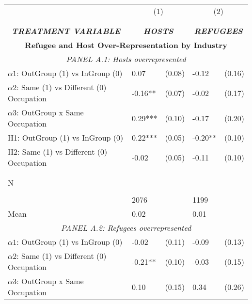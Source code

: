 \begin{tabular}{l*{4}{l}} \toprule 
                &\multicolumn{2}{c}{(1)}&\multicolumn{2}{c}{(2)}\\
                &\multicolumn{2}{c}{ } &\multicolumn{2}{c}{ } \\
\\[-0.6cm] \multicolumn{1}{c}{\textit{\textbf{TREATMENT VARIABLE}}} & \multicolumn{2}{c}{\textit{\textbf{HOSTS}}} & \multicolumn{2}{c}{\textit{\textbf{REFUGEES}}} \\ \midrule   \multicolumn{5}{c}{\textbf{Refugee and Host Over-Representation by Industry}} \\ \multicolumn{5}{c}{\textit{PANEL A.1: Hosts overrepresented}} \\  \midrule  
$\alpha1$: OutGroup (1) vs InGroup (0)&     0.07   &   (0.08)&    -0.12   &   (0.16)\\
$\alpha2$: Same (1) vs Different (0) Occupation&    -0.16** &   (0.07)&    -0.02   &   (0.17)\\
 
$\alpha3$: OutGroup x Same Occupation&     0.29***&   (0.10)&    -0.17   &   (0.20)\\
 
H1: OutGroup (1) vs InGroup (0)&     0.22***&   (0.05)&    -0.20** &   (0.10)\\
 
H2: Same (1) vs Different (0) Occupation&    -0.02   &   (0.05)&    -0.11   &   (0.10)\\
 
  \\\\[-0.5cm] N \\\\[-0.6cm]&     2076   &         &     1199   &         \\
Mean            &     0.02&         &     0.01&         \\
 
  \multicolumn{5}{c}{\textit{PANEL A.2: Refugees overrepresented}} \\  \midrule  
$\alpha1$: OutGroup (1) vs InGroup (0)&       -0.02   &      (0.11)&       -0.09   &      (0.13)\\
$\alpha2$: Same (1) vs Different (0) Occupation&       -0.21** &      (0.10)&       -0.03   &      (0.15)\\
 
$\alpha3$: OutGroup x Same Occupation&     0.10   &   (0.15)&     0.34   &   (0.26)\\
 

\end{tabular}
